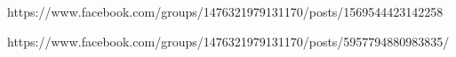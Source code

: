  
 
 
 
 


https://www.facebook.com/groups/1476321979131170/posts/1569544423142258

https://www.facebook.com/groups/1476321979131170/posts/5957794880983835/
